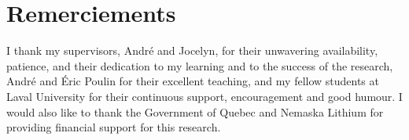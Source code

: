\chapter*{Remerciements}        %
\label{chap-remerciements}      %

I thank my supervisors, André and Jocelyn, for their unwavering availability, patience, and their dedication to my learning and to the success of the research, André and Éric Poulin for their excellent teaching, and my fellow students at Laval University for their continuous support, encouragement and good humour. I would also like to thank the Government of Quebec and Nemaska Lithium for providing financial support for this research.